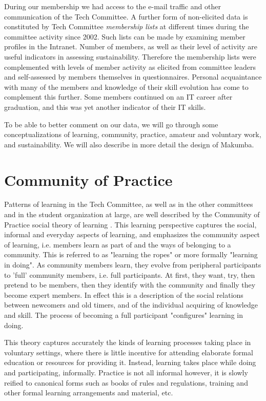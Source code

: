 \documentclass{sig-alt-release2}
\begin{document}
During our membership we had access to the e-mail traffic and other communication of the Tech Committee. A further form of non-elicited data is constituted by Tech Committee {\it membership lists} at different times during the committee activity since 2002. Such lists can be made by examining member profiles in the Intranet. Number of members, as well as their level of activity are useful indicators in assessing sustainability. Therefore the membership lists were complemented with levels of member activity as elicited from committee leaders and self-assessed by members themselves in questionnaires. Personal acquaintance with many of the members and knowledge of their skill evolution has come to complement this further. Some members continued on an IT career after graduation, and this was yet another indicator of their IT skills. 

To be able to better comment on our data, we will go through some conceptualizations of learning, community, practice, amateur and voluntary work, and sustainability. We will also describe in more detail the design of Makumba.

\section{Community of Practice}\label{sec:cop}
Patterns of learning in the Tech Committee, as well as in the other committees and in the student organization at large, are well described by the Community of Practice social theory of learning  \cite{lave_wenger91, wenger98}. This learning perspective captures the social, informal and everyday aspects of learning, and emphasizes the community aspect of learning, i.e. members learn as part of and the ways of belonging to a community. This is referred to as "learning the ropes" or more formally "learning in doing".  As community members learn, they evolve from peripheral participants to 'full' community members, i.e. full participants. At first, they want, try, then pretend to be members, then they identify with the community and finally they become expert members. 
In effect this is a description of the social relations between newcomers and old timers, and of the individual acquiring of knowledge and skill. The process of becoming a full participant "configures" learning in doing.

This theory captures accurately the kinds of learning processes taking place in voluntary settings, where there is little incentive for attending elaborate formal education or resources for providing it. Instead, learning takes place while doing and participating, informally.
Practice is not all informal however, it is slowly reified \cite{wenger98} to canonical forms such as books of rules and regulations, training and other formal learning arrangements and material, etc. 
\end{document}
